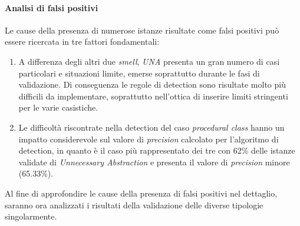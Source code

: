     \paragraph{Analisi di falsi positivi}
        Le cause della presenza di numerose istanze risultate come falsi positivi può essere ricercata in tre fattori fondamentali: 
        \begin{enumerate}
            
            \item A differenza degli altri due \textit{smell}, \textit{UNA} presenta un gran numero di casi particolari e situazioni limite, emerse soprattutto durante le fasi di validazione. Di conseguenza le regole di detection sono risultate molto più difficili da implementare, soprattutto nell'ottica di inserire limiti stringenti per le varie casistiche.
            
            
            \item Le difficoltà riscontrate nella detection del caso \textit{procedural class} hanno un impatto considerevole sul valore di \textit{precision} calcolato per l'algoritmo di detection, in quanto è il caso più rappresentato dei tre con 62\% delle istanze validate di \textit{Unnecessary Abstraction} e presenta il valore di \textit{precision} minore (65.33\%).
        \end{enumerate}
        Al fine di approfondire le cause della presenza di falsi positivi nel dettaglio, saranno ora analizzati i risultati della validazione delle diverse tipologie singolarmente.
        
